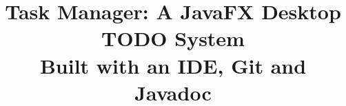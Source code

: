 \documentclass[conference,a4paper]{IEEEtran}
\begin{document}
\title{Task Manager: A JavaFX Desktop TODO System\\Built with an IDE, Git and Javadoc}

\author{%
\IEEEauthorblockN{\MemberOneName}
\and
\IEEEauthorblockN{\MemberTwoName}
\and
{}
}


\maketitle












\clearpage


\end{document}
